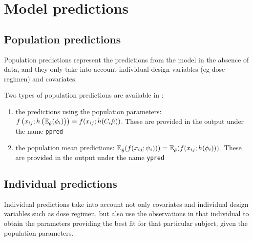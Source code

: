 
\section{Model predictions} \label{section_preds}

\subsection{Population predictions}

Population predictions represent the predictions from the model in the absence of data, and they only take into account individual design variables (eg dose regimen) and covariates.

Two types of population predictions are available in \monolix:
\begin{enumerate}
  \item the predictions using the population parameters: $f\left(x_{ij} ; h\left( \mathbb{E}_{\hat{\theta}}(\phigi) \right) \right)= f(x_{ij} ; h(C_i \hat{\fixed_effect}))$. These are provided in the output under the name \texttt{ppred}
  \item the population mean predictions:  $\mathbb{E}_{\hat{\theta}}(f(x_{ij} ; {\psi_i}) ))=\mathbb{E}_{\hat{\theta}}(f(x_{ij} ; h({{\phi}_i}) ))$. These are provided in the output under the name \texttt{ypred}
\end{enumerate}

\subsection{Individual predictions}

Individual predictions take into account not only covariates and individual design variables such as dose regimen, but also use the observations in that individual to obtain the parameters providing the best fit for that particular subject, given the population parameters.

